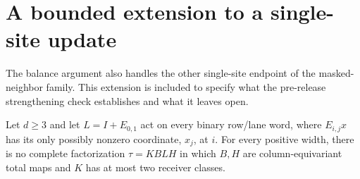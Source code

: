 \section{A bounded extension to a single-site update}
\label{sec:single-site}

The balance argument also handles the other single-site endpoint of
the masked-neighbor family.  This extension is included to specify what
the pre-release strengthening check establishes and what it leaves open.

\begin{proposition}\label{prop:single-site}
Let $d\ge3$ and let $L=I+E_{0,1}$ act on every binary row/lane word,
where $E_{i,j}x$ has its only possibly nonzero coordinate, $x_j$, at $i$.
For every positive width, there is no complete factorization
$\tau=KBLH$ in which $B,H$ are column-equivariant total maps and $K$
has at most two receiver classes.
\end{proposition}
